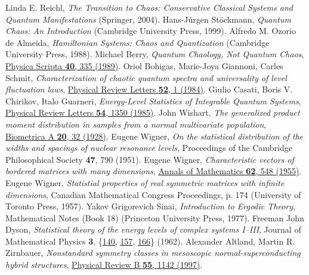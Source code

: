 \documentclass[a4paper,11pt,twoside]{article}
\begin{document}
\begin{thebibliography}{99}
     Linda E. Reichl, {\it The Transition to Chaos: Conservative Classical Systems and Quantum Manifestations} (Springer, 2004).
     Hans-Jürgen Stöckmann, {\it Quantum Chaos: An Introduction} (Cambridge University Press, 1999).
     Alfredo M. Ozorio de Almeida, {\it Hamiltonian Systems: Chaos and Quantization} (Cambridge University Press, 1988).
     Michael Berry, {\it Quantum Chaology, Not Quantum Chaos}, \href{https://iopscience.iop.org/article/10.1088/0031-8949/40/3/013}{Physica Scripta {\bf 40}, 335 (1989)}.
     Oriol Bohigas, Marie-Joya Giannoni, Carles Schmit, {\it Characterization of chaotic quantum spectra and universality of level fluctuation laws}, \href{https://journals.aps.org/prl/abstract/10.1103/PhysRevLett.52.1
    }{Physical Review Letters {\bf 52}, 1 (1984)}.
     Giulio Casati, Boris V. Chirikov, Italo Guarneri, {\it Energy-Level Statistics of Integrable Quantum Systems}, \href{https://journals.aps.org/prl/abstract/10.1103/PhysRevLett.54.1350}{Physical Review Letters {\bf 54}, 1350 (1985)}.
     John Wishart, {\it The generalized product moment distribution in samples from a normal multivariate population}, \href{https://academic.oup.com/biomet/article-abstract/20A/1-2/32/204365}{Biometrica A {\bf 20}, 32 (1928)}.
     Eugene Wigner, {\it On the statistical distribution of the widths and spacings of nuclear resonance levels}, Proceedings of the Cambridge Philosophical Society {\bf 47}, 790 (1951).
     Eugene Wigner, {\it Characteristic vectors of bordered matrices with many dimensions}, \href{https://www.jstor.org/stable/1970079}{Annals of Mathematics {\bf 62}, 548 (1955)}.
     Eugene Wigner, {\it Statistial properties of real symmetric matrices with infinite dimensions}, Canadian Mathematical Congress Proceedings, p. 174 (University of Toronto Press, 1957).
     Yakov Grigorevich Sinai, {\it Introduction to Ergodic Theory}, Mathematical Notes (Book 18) (Princeton University Press, 1977).
     Freeman John Dyson, {\it Statistical theory of the energy levels of complex systems I--III}, Journal of Mathematical Physics {\bf 3}, \{\href{https://aip.scitation.org/doi/10.1063/1.1703773}{140}, \href{https://aip.scitation.org/doi/10.1063/1.1703774}{157}, \href{https://aip.scitation.org/doi/10.1063/1.1703775}{166}\} (1962).
     Alexander Altland, Martin R. Zirnbauer, {\it Nonstandard symmetry classes in mesoscopic normal-superconducting hybrid structures}, \href{https://journals.aps.org/prb/abstract/10.1103/PhysRevB.55.1142}{Physical Review B {\bf 55}, 1142 (1997)}.

\end{thebibliography}
\end{document}
